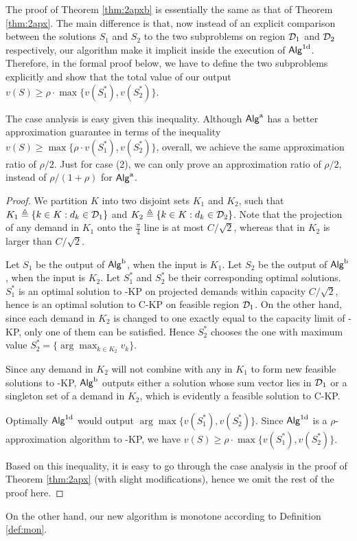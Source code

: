 \documentclass{aamas2013}
\begin{document}
The proof of Theorem \ref{thm:2apxb} is essentially the same as that of Theorem \ref{thm:2apx}.  The main difference is that, now instead of an explicit comparison between the solutions $S_1$ and $S_2$ to the two subproblems on region ${\cal D}_1$ and ${\cal D}_2$ respectively, our algorithm make it implicit inside the execution of ${\sf Alg}^{\rm 1d}$.  Therefore, in the formal proof below, we have to define the two subproblems explicitly and show that the total value of our output $v(S) \ge \rho \cdot \max\{ v(S_1^\ast), v({S_2^\ast})\}$.  

The case analysis is easy given this inequality.  Although ${\sf Alg}^{\rm a}$ has a better approximation guarantee in terms of the inequality $v(S)\geq \max\{ \rho \cdot v(S_1^\ast), v({S_2^\ast})\}$, overall, we achieve the same approximation ratio of $\rho/2$.  Just for case (2), we can only prove an approximation ratio of $\rho/2$, instead of $\rho/(1+\rho)$ for ${\sf Alg}^{\rm a}$.  


\begin{proof}
We partition $K$ into two disjoint sets $K_1$ and $K_2$, such that $K_1 \triangleq \{ k \in K : d_k \in {\cal D}_1 \}$ and $K_2 \triangleq \{ k \in K : d_k \in {\cal D}_2 \}$. Note that the projection of any demand in $K_1$ onto the $\frac{\pi}{4}$ line is at most $C/\sqrt{2}$, whereas that in $K_2$ is larger than $C/\sqrt{2}$.


Let $S_1$ be the output of ${\sf Alg}^{\rm b}$, when the input is $K_1$. Let $S_2$ be the output of ${\sf Alg}^{\rm b}$, when the input is $K_2$.  Let $S_1^\ast$ and $S_2^\ast$ be their corresponding optimal solutions.  $S_1^\ast$ is an optimal solution to {-KP} on projected demands within capacity $C/\sqrt{2}$, hence is an optimal solution to {\sc C-KP} on feasible region ${\cal D}_1$.  On the other hand, since each demand in $K_2$ is changed to one exactly equal to the capacity limit of {-KP}, only one of them can be satisfied.  Hence $S_2^\ast$ chooses the one with maximum value $S_2^*=\{\arg\max_{k\in K_2} v_k\}$.  

Since any demand in $K_2$ will not combine with any in $K_1$ to form new feasible solutions to {-KP}, ${\sf Alg}^{\rm b}$ outputs either a solution whose sum vector lies in ${\cal D}_1$ or a singleton set of a demand in $K_2$, which is evidently a feasible solution to {\sc C-KP}.

Optimally ${\sf Alg}^{\rm 1d}$ would output $\arg\max \{v(S_1^\ast),v(S_2^\ast)\}$.  Since ${\sf Alg}^{\rm 1d}$ is a $\rho$-approximation algorithm to {-KP}, we have $v(S) \ge \rho \cdot \max\{ v(S_1^\ast), v({S_2^\ast})\}$. 

Based on this inequality, it is easy to go through the case analysis in the proof of Theorem \ref{thm:2apx} (with slight modifications), hence we omit the rest of the proof here.  
\end{proof}
On the other hand, our new algorithm is monotone according to Definition \ref{def:mon}. 
\end{document}
